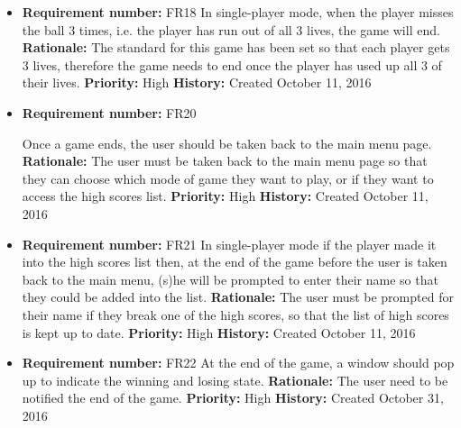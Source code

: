 \documentclass[12pt,letterpaper]{article}
\begin{document}
\begin{reqbox}
	\begin{itemize}
		\item \textbf{Requirement number: }FR18
		In single-player mode, when the player misses the ball 3 times, i.e. the player has run out of all 3 lives, the game will end.
		\textbf{Rationale: }The standard for this game has been set so that each player gets 3 lives, therefore the game needs to end once the player has used up all 3 of their lives.
		\textbf{Priority: }High
		\textbf{History: }Created October 11, 2016
	\end{itemize}
\end{reqbox}
\begin{reqbox}
\end{reqbox}
\begin{reqbox}
	\begin{itemize}
		\item \textbf{Requirement number: }FR20
	
		Once a game ends, the user should be taken back to the main menu page.
		\textbf{Rationale: }The user must be taken back to the main menu page so that they can choose which mode of game they want to play, or if they want to access the high scores list.
		\textbf{Priority: }High
		\textbf{History: }Created October 11, 2016
	\end{itemize}
\end{reqbox}
\begin{reqbox}
	\begin{itemize}
		\item \textbf{Requirement number: }FR21
		In single-player mode if the player made it into the high scores list then, at the end of the game before the user is taken back to the main menu, (s)he will be prompted to enter their name so that they could be added into the list.
		\textbf{Rationale: }The user must be prompted for their name if they break one of the high scores, so that the list of high scores is kept up to date.
		\textbf{Priority: }High
		\textbf{History: }Created October 11, 2016
	\end{itemize}
\end{reqbox}
\begin{reqbox}
	\begin{itemize}
		\item \textbf{Requirement number: }FR22
		At the end of the game, a window should pop up to indicate the winning and losing state.
		\textbf{Rationale: }The user need to be notified the end of the game.
		\textbf{Priority: }High
		\textbf{History: }Created October 31, 2016
	\end{itemize}
\end{reqbox}
		
\end{document}
